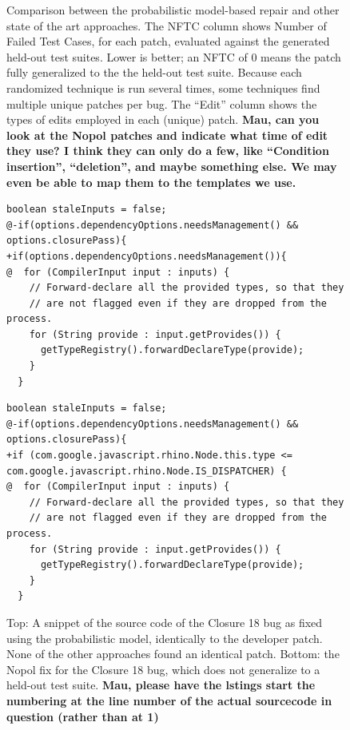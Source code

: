 \documentclass[conference]{IEEEtran}
\newcommand{\todo}[1]
  {{\scriptsize \textbf{\color{red} {#1}}}}
\begin{document}
\begin{figure}
{\begin{tabular}{l|c|lr|lr|lr|lr|lr}
\end{tabular}}
  \caption{Comparison between the probabilistic model-based repair and
    other state of the art approaches. The NFTC column shows Number of Failed
    Test Cases, for each patch, evaluated against the generated held-out test suites.  Lower is better; an NFTC
    of 0 means the patch fully generalized to the the held-out test
    suite. Because each randomized technique is run several times, some
    techniques find multiple unique patches per bug. The ``Edit'' column shows
    the types of edits employed in each (unique) patch.\todo{Mau, can you look
      at the Nopol patches and indicate what time of edit they use? I think
      they can only do a few, like ``Condition insertion'', ``deletion'', and
      maybe something else.  We may even be able to map them to the templates
      we use.} \label{stateOfTheArtComparison}} 
\end{figure}


\begin{figure}[t]
\begin{lstlisting}[frame=single]
boolean staleInputs = false;
@-if(options.dependencyOptions.needsManagement() && options.closurePass){
+if(options.dependencyOptions.needsManagement()){
@  for (CompilerInput input : inputs) {
    // Forward-declare all the provided types, so that they
    // are not flagged even if they are dropped from the process.
    for (String provide : input.getProvides()) {
      getTypeRegistry().forwardDeclareType(provide);
    }  
  }
	\end{lstlisting}


\begin{lstlisting}[frame=single]
boolean staleInputs = false;
@-if(options.dependencyOptions.needsManagement() && options.closurePass){
+if (com.google.javascript.rhino.Node.this.type <= com.google.javascript.rhino.Node.IS_DISPATCHER) {
@  for (CompilerInput input : inputs) {
    // Forward-declare all the provided types, so that they
    // are not flagged even if they are dropped from the process.
    for (String provide : input.getProvides()) {
      getTypeRegistry().forwardDeclareType(provide);
    }  
  }
	\end{lstlisting}

	\caption{Top: A snippet of the source code of the Closure 18 bug as fixed using the
      probabilistic model, identically to the developer patch. None of the other
      approaches found an identical patch.  Bottom: the Nopol fix for the
      Closure 18 bug, which does not generalize to a held-out test
      suite.\label{closure18prob}\todo{Mau, please have the lstings start the
        numbering at the line number of the actual sourcecode in question
        (rather than at 1)}}
\end{figure}
\end{document}
